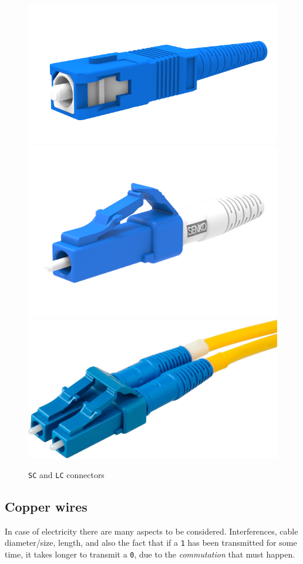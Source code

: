 \begin{figure}[htbp]
   \centering
   \includegraphics[width=0.25\columnwidth]{images/SC.png}
   \includegraphics[width=0.25\columnwidth]{images/LC.png}
   \includegraphics[width=0.25\columnwidth]{images/LC_coupled.JPG}
   \caption{\texttt{SC} and \texttt{LC} connectors}
   \label{fig:sc_lc_connectors}
\end{figure}

\subsection{Copper wires}
In case of electricity there are many aspects to be considered. Interferences, cable diameter/size, length, and also the fact that if a \texttt{1} has been transmitted for some time, it takes longer to transmit a \texttt{0}, due to the \textit{commutation} that must happen.
\nl

